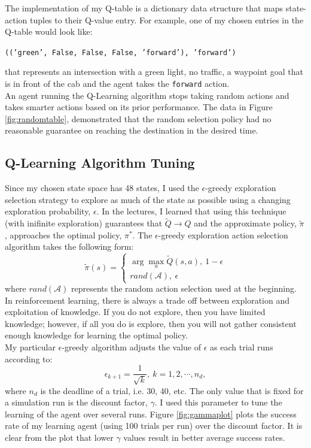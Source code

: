 \documentclass[12pt,letterpaper]{article}
\begin{document}
The implementation of my Q-table is a dictionary data structure that maps state-action tuples to their Q-value entry. For example, one of my chosen entries in the Q-table would look like:
\begin{center}
	\texttt{(('green', False, False, False, 'forward'), 'forward')}
\end{center}
that represents an intersection with a green light, no traffic, a waypoint goal that is in front of the cab and the agent takes the \verb|forward| action. \\

An agent running the Q-Learning algorithm stops taking random actions and takes smarter actions based on its prior performance.
The data in Figure \ref{fig:randomtable}, demonstrated that the random selection policy had no reasonable guarantee on reaching the destination in the desired time.

\subsection*{Q-Learning Algorithm Tuning}

Since my chosen state space has 48 states, I used the $\epsilon$-greedy exploration selection strategy to explore as much of the state as possible using a changing exploration probability, $\epsilon$.
In the lectures, I learned that using this technique (with inifinite exploration) guarantees that $\tilde{Q}\rightarrow Q$ and the approximate policy, $\tilde{\pi}$, approaches the optimal policy, $\pi^*$.
The $\epsilon$-greedy exploration action selection algorithm takes the following form:
$$
	\tilde{\pi}(s) = \left\{\begin{array}{c} \arg \max_a \tilde{Q}(s,a), \ 1-\epsilon \\ rand(\mathcal{A}), \ \epsilon \end{array}\right.
$$
where $rand(\mathcal{A})$ represents the random action selection used at the beginning.
In reinforcement learning, there is always a trade off between exploration and exploitation of knowledge.
If you do not explore, then you have limited knowledge; however, if all you do is explore, then you will not gather consistent enough knowledge for learning the optimal policy. \\

My particular $\epsilon$-greedy algorithm adjusts the value of $\epsilon$ as each trial runs according to:
$$
	\epsilon_{k+1} = \frac{1}{\sqrt{k}}, \ k=1,2,\cdots,n_{d},
$$
where $n_{d}$ is the deadline of a trial, i.e. 30, 40, etc.
The only value that is fixed for a simulation run is the discount factor, $\gamma$.
I used this parameter to tune the learning of the agent over several runs.
Figure \ref{fig:gammaplot} plots the success rate of my learning agent (using 100 trials per run) over the discount factor.
It is clear from the plot that lower $\gamma$ values result in better average success rates.
\end{document}
